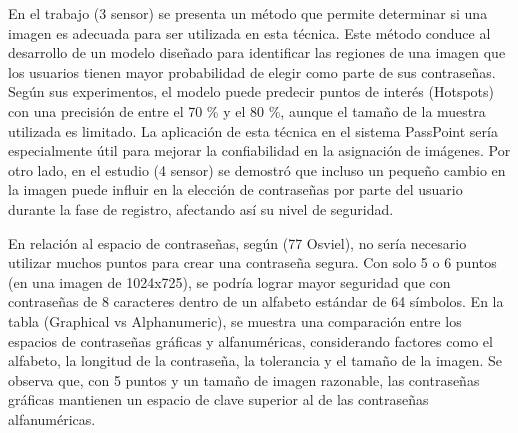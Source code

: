 \documentclass[12pt]{report}
\begin{document}
	
	En el trabajo (3 sensor) se presenta un método que permite determinar si una imagen es adecuada para ser utilizada en esta técnica. Este método conduce al desarrollo de un modelo diseñado para identificar las regiones de una imagen que los usuarios tienen mayor probabilidad de elegir como parte de sus contraseñas. Según sus experimentos, el modelo puede predecir puntos de interés (Hotspots) con una precisión de entre el 70 \% y el 80 \%, aunque el tamaño de la muestra utilizada es limitado. La aplicación de esta técnica en el sistema PassPoint sería especialmente útil para mejorar la confiabilidad en la asignación de imágenes. Por otro lado, en el estudio (4 sensor) se demostró que incluso un pequeño cambio en la imagen puede influir en la elección de contraseñas por parte del usuario durante la fase de registro, afectando así su nivel de seguridad.    

	
	En relación al espacio de contraseñas, según (77 Osviel), no sería necesario utilizar muchos puntos para crear una contraseña segura. Con solo 5 o 6 puntos (en una imagen de 1024x725), se podría lograr mayor seguridad que con contraseñas de 8 caracteres dentro de un alfabeto estándar de 64 símbolos. En la tabla (Graphical vs Alphanumeric), se muestra una comparación entre los espacios de contraseñas gráficas y alfanuméricas, considerando factores como el alfabeto, la longitud de la contraseña, la tolerancia y el tamaño de la imagen. Se observa que, con 5 puntos y un tamaño de imagen razonable, las contraseñas gráficas mantienen un espacio de clave superior al de las contraseñas alfanuméricas.
	
\end{document}
